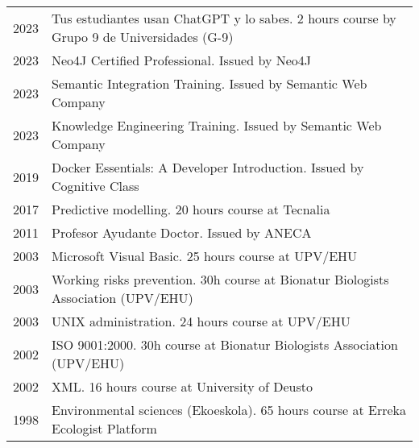 \documentclass[11pt,fullpage]{article}
\begin{document}
\begin{longtable}{p{0.5in}|p{5.5in}}
  2023 & Tus estudiantes usan ChatGPT y lo sabes. 2 hours course by Grupo 9 de Universidades (G-9) \\
  2023 & Neo4J Certified Professional. Issued by Neo4J \\ %
  2023 & Semantic Integration Training. Issued by Semantic Web Company \\ %
  2023 & Knowledge Engineering Training. Issued by Semantic Web Company \\ %
  2019 & Docker Essentials: A Developer Introduction. Issued by Cognitive Class \\ %
  2017 & Predictive modelling. 20 hours course at Tecnalia \\
  2011 & Profesor Ayudante Doctor. Issued by ANECA \\
  2003 & Microsoft Visual Basic. 25 hours course at UPV/EHU \\
  2003 & Working risks prevention. 30h course at Bionatur Biologists Association (UPV/EHU) \\
  2003 & UNIX administration. 24 hours course at UPV/EHU \\
  2002 & ISO 9001:2000. 30h course at Bionatur Biologists Association (UPV/EHU) \\
  2002 & XML. 16 hours course at University of Deusto \\
  1998 & Environmental sciences (Ekoeskola). 65 hours course at Erreka Ecologist Platform \\
  
\end{longtable}
\end{document}
